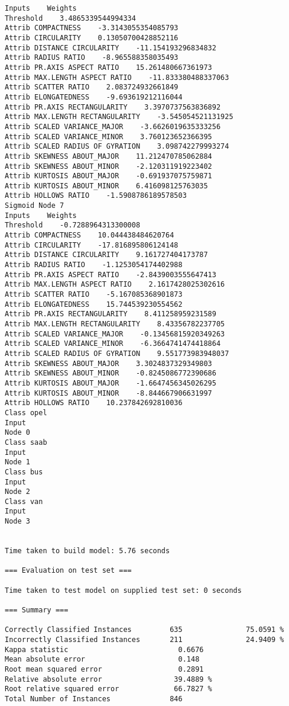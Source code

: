 \documentclass[
	article,			%
	11pt,				%
	oneside,			%
	a4paper,			%
	english,			%
	brazil,				%
	sumario=tradicional
	]{abntex2}
\begin{document}
\begin{lstlisting}
Inputs    Weights
Threshold    3.4865339544994334
Attrib COMPACTNESS    -3.3143055354085793
Attrib CIRCULARITY    0.13050700428852116
Attrib DISTANCE CIRCULARITY    -11.154193296834832
Attrib RADIUS RATIO    -8.965588358035493
Attrib PR.AXIS ASPECT RATIO    15.261480667361973
Attrib MAX.LENGTH ASPECT RATIO    -11.833380488337063
Attrib SCATTER RATIO    2.083724932661849
Attrib ELONGATEDNESS    -9.693619212116044
Attrib PR.AXIS RECTANGULARITY    3.3970737563836892
Attrib MAX.LENGTH RECTANGULARITY    -3.545054521131925
Attrib SCALED VARIANCE_MAJOR    -3.6626019635333256
Attrib SCALED VARIANCE_MINOR    3.760123652366395
Attrib SCALED RADIUS OF GYRATION    3.098742279993274
Attrib SKEWNESS ABOUT_MAJOR    11.212470785062884
Attrib SKEWNESS ABOUT_MINOR    -2.120311919223402
Attrib KURTOSIS ABOUT_MAJOR    -0.691937075759871
Attrib KURTOSIS ABOUT_MINOR    6.416098125763035
Attrib HOLLOWS RATIO    -1.5908786189578503
Sigmoid Node 7
Inputs    Weights
Threshold    -0.7288964313300008
Attrib COMPACTNESS    10.044438484620764
Attrib CIRCULARITY    -17.816895806124148
Attrib DISTANCE CIRCULARITY    9.161727404173787
Attrib RADIUS RATIO    -1.1253054174402988
Attrib PR.AXIS ASPECT RATIO    -2.8439003555647413
Attrib MAX.LENGTH ASPECT RATIO    2.1617428025302616
Attrib SCATTER RATIO    -5.167085368901873
Attrib ELONGATEDNESS    15.744539230554562
Attrib PR.AXIS RECTANGULARITY    8.411258959231589
Attrib MAX.LENGTH RECTANGULARITY    8.43356782237705
Attrib SCALED VARIANCE_MAJOR    -0.13456815920349263
Attrib SCALED VARIANCE_MINOR    -6.3664741474418864
Attrib SCALED RADIUS OF GYRATION    9.551773983948037
Attrib SKEWNESS ABOUT_MAJOR    3.3024837329349803
Attrib SKEWNESS ABOUT_MINOR    -0.8245086772390686
Attrib KURTOSIS ABOUT_MAJOR    -1.6647456345026295
Attrib KURTOSIS ABOUT_MINOR    -8.844667906631997
Attrib HOLLOWS RATIO    10.237842692810036
Class opel
Input
Node 0
Class saab
Input
Node 1
Class bus
Input
Node 2
Class van
Input
Node 3


Time taken to build model: 5.76 seconds

=== Evaluation on test set ===

Time taken to test model on supplied test set: 0 seconds

=== Summary ===

Correctly Classified Instances         635               75.0591 %
Incorrectly Classified Instances       211               24.9409 %
Kappa statistic                          0.6676
Mean absolute error                      0.148 
Root mean squared error                  0.2891
Relative absolute error                 39.4889 %
Root relative squared error             66.7827 %
Total Number of Instances              846     


\end{lstlisting}
\end{document}
